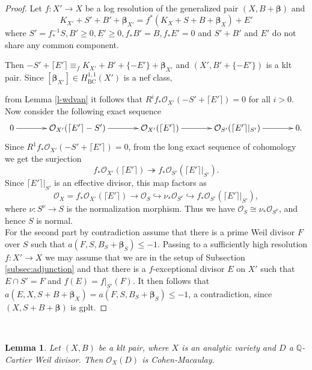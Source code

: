 \documentclass[12pt]{amsart}
\theoremstyle{plain}
\newtheorem{lemma}[theorem]{Lemma}
\theoremstyle{remark}
\theoremstyle{definition}
\def\BC{\operatorname{BC}}
\newcommand{\<}{\leq}
\def\>{\geq}
\newcommand{\mbQ}{\mathbb{Q}}
\def\mcO{\mathcal{O}}
\newcommand{\num}{\equiv}
\def\injective{\hookrightarrow}
\def\surjective{\twoheadrightarrow}
\def\>{\geq}
\def\mcO{\mathcal{O}}
\def\lru{\lceil}
\def\rru{\rceil}
\def\bbeta{\boldsymbol{\beta}}
\theoremstyle{definition}
\theoremstyle{definition}
\numberwithin{equation}{section}
\theoremstyle{remark}
\begin{document}
\begin{proof}

    Let $f:X'\to X$ be a log resolution of the generalized pair $(X, B+\bbeta)$ and 
\[ 
K_{X'}+S'+B'+\bbeta_{X'}=f^*(K_X+S+B+\bbeta_X)+E'
\]
where $S'=f^{-1}_*S, B'\>0, E'\>0, f_*B'=B, f_*E'=0$ and $S'+B'$ and $E'$ do not share any common component.

Then $-S'+\lru E'\rru \num_f K_{X'}+B'+\{-E'\}+\bbeta_{X'}$ and $(X', B'+\{-E'\})$ is a klt pair. Since $[\bbeta_{X'}]\in H^{1,1}_{\BC}(X')$ is a nef class,

from Lemma \ref{l-wdvan} it follows that $R^if_*\mcO_{X'}(-S'+\lru E'\rru)=0$ for all $i>0$. Now consider the following exact sequence 
\begin{equation*}
\xymatrixcolsep{3pc}\xymatrix{
0\ar[r] & \mcO_{X'}(\lru E'\rru -S')\ar[r] & \mcO_{X'}(\lru E'\rru)\ar[r] & \mcO_{S'}(\lru E'\rru|_{S'})\ar[r] & 0.
}
\end{equation*}
Since $R^1f_*\mcO_{X'}(-S'+\lru E'\rru)=0$, from the long exact sequence of cohomology we get the surjection 
\[ 
f_*\mcO_{X'}(\lru E'\rru)\surjective f_*\mcO_{S'}(\lru E'\rru|_{S'}).
\]
Since $\lru E'\rru|_{S'}$ is an effective divisor, this map factors as
\[
\mcO_{X}=f_*\mcO_{X'}(\lru E'\rru)\to \mcO_{S}\injective \nu_*\mcO_{S^\nu}\injective f_*\mcO_{S'}(\lru E'\rru|_{S'}),
\]
where $\nu:S^\nu\to S$ is the normalization morphism. Thus we have $\mcO_{S}\cong\nu_*\mcO_{S^\nu}$, and hence $S$ is normal.\\


For the second part by contradiction assume that there is a prime Weil divisor $F$ over $S$ such that $a(F, S, B_S+\bbeta_S)\<-1$. Passing to a sufficiently high resolution $f:X'\to X$ we may assume that we are in the setup of Subsection \ref{subsec:adjunction} and that there is a $f$-exceptional divisor $E$ on $X'$ such that $E\cap S'=F$ and $f(E)=f|_{S'}(F)$. It then follows that $a(E, X, S+B+\bbeta_X)=a(F, S, B_S+\bbeta_S)\<-1$, a contradiction, since $(X, S+B+\bbeta)$ is gplt.   

\end{proof}~\\



\begin{lemma}\label{lem:CM-sheaves}
    Let $(X, B)$ be a klt pair, where $X$ is an analytic variety and $D$ a $\mbQ$-Cartier Weil divisor. Then $\mcO_X(D)$ is Cohen-Macaulay.
\end{lemma}
\end{document}
